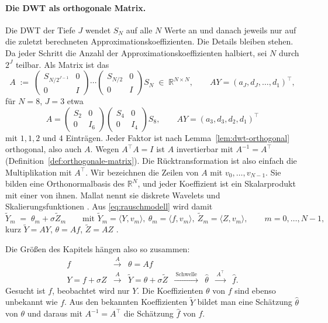 \documentclass[a4paper,11pt,bibliography=totoc,listof=totoc,headinclude=true,cleardoublepage=empty,oneside]{scrbook}
\theoremstyle{plain}
\theoremstyle{definition}
\newcommand{\R}{\mathbb{R}}
\newcommand{\scal}[2]{\langle #1, #2 \rangle}
\begin{document}
\paragraph{Die DWT als orthogonale Matrix.}
Die DWT der Tiefe $J$ wendet $S_N$ auf alle $N$ Werte an und danach jeweils
nur auf die zuletzt berechneten Approximationskoeffizienten. Die Details
bleiben stehen. Da jeder Schritt die Anzahl der Approximationskoeffizienten
halbiert, sei $N$ durch $2^J$ teilbar. Als Matrix ist das
\[
  A \;:=\; \begin{pmatrix} S_{N/2^{J-1}} & 0\\ 0 & I\end{pmatrix}\cdots
           \begin{pmatrix} S_{N/2} & 0\\ 0 & I\end{pmatrix} S_N
  \;\in\;\R^{N\times N},
  \qquad AY = (a_J, d_J, \dots, d_1)^\top ,
\]
für $N = 8$, $J = 3$ etwa
\[
  A = \begin{pmatrix} S_2 & 0\\ 0 & I_6\end{pmatrix}
      \begin{pmatrix} S_4 & 0\\ 0 & I_4\end{pmatrix} S_8,
  \qquad AY = (a_3, d_3, d_2, d_1)^\top
\]
mit $1, 1, 2$ und $4$ Einträgen. Jeder Faktor ist nach
Lemma~\ref{lem:dwt-orthogonal} orthogonal, also auch $A$. Wegen $A^\top A = I$ ist $A$ invertierbar mit $A^{-1} = A^\top$
(Definition~\ref{def:orthogonale-matrix}). Die Rücktransformation ist also
einfach die Multiplikation mit $A^\top$. Wir bezeichnen die
Zeilen von $A$ mit $v_0,\dots,v_{N-1}$. Sie bilden eine Orthonormalbasis des
$\R^N$, und jeder Koeffizient ist ein Skalarprodukt mit einer von ihnen.
Mallat nennt sie diskrete Wavelets und Skalierungsfunktionen
\cite[Kap.~7.5, Gl.~(7.173)]{mallat}. %
Aus \eqref{eq:rauschmodell} wird damit
\begin{equation}
\label{eq:rauschmodell-koeff}
  \tilde Y_m \;=\; \theta_m + \sigma\tilde Z_m \qquad\text{mit }
  \tilde Y_m = \scal{Y}{v_m},\ \theta_m = \scal{f}{v_m},\ \tilde Z_m = \scal{Z}{v_m},
  \qquad m = 0,\dots,N-1,
\end{equation}
kurz $\tilde Y = AY$, $\theta = Af$, $\tilde Z = AZ$ \cite[Kap.~11.2.1]{mallat}. %
 
Die Grö\ss en des Kapitels hängen also so zusammen:
\[
  \begin{array}{ccccccc}
    f & \xrightarrow{\ A\ } & \theta = Af & & & & \\[2pt]
    Y = f + \sigma Z & \xrightarrow{\ A\ } & \tilde Y = \theta + \sigma\tilde Z
      & \xrightarrow{\ \text{Schwelle}\ } & \hat\theta
      & \xrightarrow{\ A^\top\ } & \hat f .
  \end{array}
\]
Gesucht ist $f$, beobachtet wird nur $Y$. Die Koeffizienten $\theta$ von $f$
sind ebenso unbekannt wie $f$. Aus den bekannten Koeffizienten $\tilde Y$
bildet man eine Schätzung $\hat\theta$ von $\theta$ und daraus mit
$A^{-1} = A^\top$ die Schätzung $\hat f$ von $f$.
 
\end{document}
